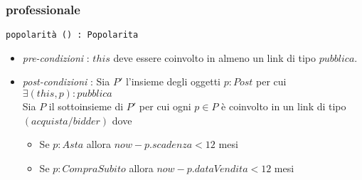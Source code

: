 \documentclass[12pt, letterpaper]{article}
\newcommand{\code}[1]{\colorbox{light-gray}{\texttt{#1}}}
\begin{document}
\subsubsection{professionale}
\code{popolarità () : Popolarita}\begin{itemize}
    \item \textit{pre-condizioni} : $this$ deve essere coinvolto in almeno un link di tipo $pubblica$.
    \item \textit{post-condizioni} : Sia $P'$ l'insieme degli oggetti $p:Post$ per cui $\exists (this,p):pubblica$\\
            Sia $P$ il sottoinsieme di $P'$ per cui ogni $p\in P$ è coinvolto in un link di tipo $(acquista/bidder)$ dove 
            \begin{itemize}
                \item Se $p:Asta$ allora $now - p.scadenza < 12$ mesi 
                \item Se $p:CompraSubito$ allora $now - p.dataVendita < 12$ mesi 
            \end{itemize}
            

\end{itemize}
\end{document}
